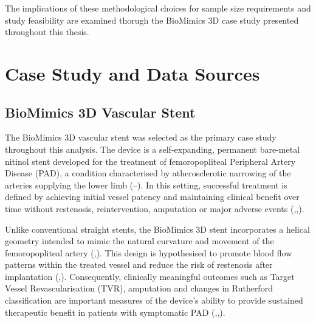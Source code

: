 \documentclass{article}
\begin{document}
The implications of these methodological choices for sample size
requirements and study feasibility are examined thorugh the BioMimics 3D
case study presented throughout this thesis.

\section{Case Study and Data Sources}\label{case-study-and-data-sources}

\subsection{BioMimics 3D Vascular
Stent}\label{biomimics-3d-vascular-stent}

The BioMimics 3D vascular stent was selected as the primary case study
throughout this analysis. The device is a self-expanding, permanent
bare-metal nitinol stent developed for the treatment of femoropopliteal
Peripheral Artery Disease (PAD), a condition characterised by
atherosclerotic narrowing of the arteries supplying the lower limb
(--).
In this setting, successful treatment is defined by achieving initial
vessel patency and maintaining clinical benefit over time without
restenosis, reintervention, amputation or major adverse events
(,,).

Unlike conventional straight stents, the BioMimics 3D stent incorporates
a helical geometry intended to mimic the natural curvature and movement
of the femoropopliteal artery
(,).
This design is hypothesised to promote blood flow patterns within the
treated vessel and reduce the risk of restenosis after implantation
(,).
Consequently, clinically meaningful outcomes such as Target Vessel
Revascularisation (TVR), amputation and changes in Rutherford
classification are important measures of the device's ability to provide
sustained therapeutic benefit in patients with symptomatic PAD
(,,).
\end{document}
